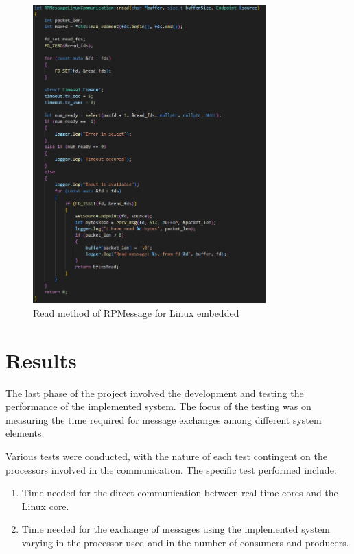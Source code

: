 \begin{figure}[H]
    \centering
    \includegraphics[width=0.8\textwidth]{Figures/implementation_rpmessage_linux_read.png}
    \caption{Read method of RPMessage for Linux embedded}
\end{figure}

\section{Results}

The last phase of the project involved the development and testing
the performance of the implemented system.
The focus of the testing was on measuring the time required for message
exchanges among different system elements.

Various tests were conducted, with the nature of each test contingent on the
processors involved in the communication.
The specific test performed include:

\begin{enumerate}
    \item   Time needed for the direct communication between real time cores
            and the Linux core.
    \item   Time needed for the exchange of messages using the implemented
            system varying in the processor used and in the number of
            consumers and producers.
\end{enumerate}

